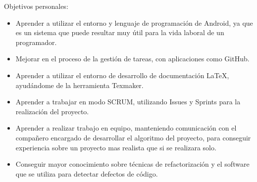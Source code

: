 Objetivos personales:
\begin{itemize}
\item Aprender a utilizar el entorno y lenguaje de programación de Android, ya que es un sistema que puede resultar muy útil para la vida laboral de un programador.
\item Mejorar en el proceso de la gestión de tareas, con aplicaciones como GitHub.
\item Aprender a utilizar el entorno de desarrollo de documentación LaTeX, ayudándome de la herramienta Texmaker.
\item Aprender a trabajar en modo SCRUM, utilizando Issues y Sprints para la realización del proyecto.
\item Aprender a realizar trabajo en equipo, manteniendo comunicación con el compañero encargado de desarrollar el algoritmo del proyecto, para conseguir experiencia sobre un proyecto mas realista que si se realizara solo.
\item Conseguir mayor conocimiento sobre técnicas de refactorización y el software que se utiliza para detectar defectos de código.
\end{itemize}

